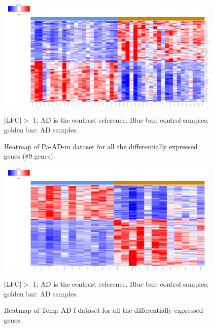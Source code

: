 \begin{figure}[!ht]
    \centerline{\includegraphics[width = 11cm]{Figures/DE heatmap/CTLvsAD-Pa-m_89.png}}
\caption{Heatmap of Pa-AD-m dataset for all the differentially expressed genes (89 genes).}
\label{DE-pa-ad-m}
\footnotesize $|$LFC$| >$ 1; AD is the contrast reference. Blue bar: control samples; golden bar: AD samples.
\end{figure}


\begin{figure}[!ht]
    \centerline{\includegraphics[width = 11cm]{Figures/DE heatmap/CTLvsAD-TCx-f_all.png}}
\caption{Heatmap of Temp-AD-f dataset for all the differentially expressed genes.}
\label{DE-temp-ad-f}
\footnotesize $|$LFC$| >$ 1; AD is the contrast reference. Blue bar: control samples; golden bar: AD samples.
\end{figure}


